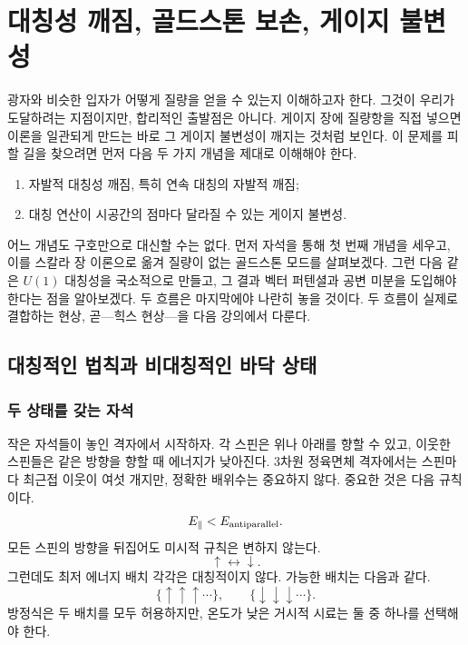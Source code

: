 \chapter{대칭성 깨짐, 골드스톤 보손, 게이지 불변성}

광자와 비슷한 입자가 어떻게 질량을 얻을 수 있는지 이해하고자 한다. 그것이 우리가 도달하려는 지점이지만, 합리적인 출발점은 아니다. 게이지 장에 질량항을 직접 넣으면 이론을 일관되게 만드는 바로 그 게이지 불변성이 깨지는 것처럼 보인다. 이 문제를 피할 길을 찾으려면 먼저 다음 두 가지 개념을 제대로 이해해야 한다.
\begin{enumerate}
  \item 자발적 대칭성 깨짐, 특히 연속 대칭의 자발적 깨짐;
  \item 대칭 연산이 시공간의 점마다 달라질 수 있는 게이지 불변성.
\end{enumerate}
어느 개념도 구호만으로 대신할 수는 없다. 먼저 자석을 통해 첫 번째 개념을 세우고, 이를 스칼라 장 이론으로 옮겨 질량이 없는 골드스톤 모드를 살펴보겠다. 그런 다음 같은 \(U(1)\) 대칭성을 국소적으로 만들고, 그 결과 벡터 퍼텐셜과 공변 미분을 도입해야 한다는 점을 알아보겠다. 두 흐름은 마지막에야 나란히 놓을 것이다. 두 흐름이 실제로 결합하는 현상, 곧---힉스 현상---을 다음 강의에서 다룬다.

\section{대칭적인 법칙과 비대칭적인 바닥 상태}

\subsection{두 상태를 갖는 자석}

작은 자석들이 놓인 격자에서 시작하자. 각 스핀은 위나 아래를 향할 수 있고, 이웃한 스핀들은 같은 방향을 향할 때 에너지가 낮아진다. 3차원 정육면체 격자에서는 스핀마다 최근접 이웃이 여섯 개지만, 정확한 배위수는 중요하지 않다. 중요한 것은 다음 규칙이다.
\begin{equation}
  E_{\parallel}<E_{\rm antiparallel}.
\end{equation}
모든 스핀의 방향을 뒤집어도 미시적 규칙은 변하지 않는다.
\begin{equation}
  \uparrow\longleftrightarrow\downarrow.
\end{equation}
그런데도 최저 에너지 배치 각각은 대칭적이지 않다. 가능한 배치는 다음과 같다.
\begin{equation}
  \{\uparrow\uparrow\uparrow\cdots\},
  \qquad
  \{\downarrow\downarrow\downarrow\cdots\}.
\end{equation}
방정식은 두 배치를 모두 허용하지만, 온도가 낮은 거시적 시료는 둘 중 하나를 선택해야 한다.

